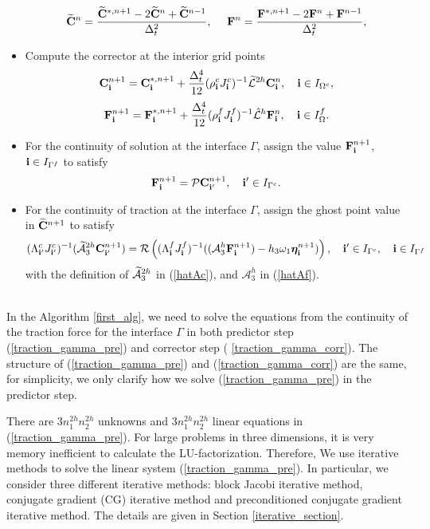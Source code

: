 \begin{breakablealgorithm}
\begin{itemize}
{			\begin{equation*}
			\widetilde{\bf C}^n= \frac{\widetilde{\bf C}^{*,n+1}-2\widetilde{\bf C}^{n}+\widetilde{\bf C}^{n-1}}{\Delta^2_t},\ \ \ \
			{\bf F}^{n} = \frac{{\bf F}^{*,n+1}-2{\bf F}^{n}+{\bf F}^{n-1}}{\Delta^2_t},
			\end{equation*}
		}
		\item{Compute the corrector at the interior grid points
			\[{\bf C}^{n+1}_{\bf i} = {\bf C}^{*,n+1}_{\bf i} + \frac{\Delta_t^4}{12}(\rho^{c}_{\bf i}J^c_{\bf i})^{-1}\widetilde{\mathcal{L}}^{2h}{\bf{C}}^{n}_{\bf i},\quad {\bf i}\in I_{\Omega^c},\]
			\[{\bf F}^{n+1}_{\bf i} = {\bf F}^{*,n+1}_{\bf i} + \frac{\Delta_t^4}{12}(\rho^{f}_{\bf i}J^f_{\bf i})^{-1}\hat{\mathcal{L}}^{h}{\bf{F}}^{n}_{\bf i},\quad {\bf i}\in I_\Omega^f.\]
		}
		\item{For the continuity of solution at the interface $\Gamma$, assign the value ${\bf F}^{n+1}_{\bf i}$, ${\bf i}\in I_{\Gamma^f}$ to satisfy
			\begin{equation*}
			{\bf F}^{n+1}_{\bf i} = {\mathcal{P}}{\bf C}^{n+1}_{{\bf i}'}, \quad {{\bf i}'}\in I_{\Gamma^c}.
			\end{equation*}
		}
		\item{For the continuity of traction at the interface $\Gamma$, assign the ghost point value in $\widetilde{\bf C}^{n+1}$ to satisfy
			\begin{equation}\label{traction_gamma_corr}
			({\Lambda}^{c}_{{\bf i}'}{J}_{{\bf i}'}^{c})^{-1}(\wt{\mathcal{A}}_3^{2h}{\bf C}^{n+1}_{{\bf i}'})
			= {\mathcal{R}}\left(({\Lambda}^{f}_{\bf i}{ J}^f_{\bf i})^{-1}((\mathcal{A}_3^h{\bf F}^{n+1}_{\bf i})-h_3\omega_1{\bm \eta}^{n+1}_{\bf i})\right), \quad {{\bf i}'}\in I_{\Gamma^c}, \quad {\bf i}\in I_{\Gamma^f}
			\end{equation}
			with the definition of $\widetilde{\mathcal{A}}_3^{2h}$ in (\ref{hatAc}), and $\mathcal{A}_3^h$ in (\ref{hatAf}).
		}
	\end{itemize}
\end{breakablealgorithm}
~\\

In the Algorithm \ref{first_alg}, we need to solve the equations from the continuity of the traction force for the interface $\Gamma$ in both predictor step (\ref{traction_gamma_pre}) and corrector step (
\ref{traction_gamma_corr}). The structure of (\ref{traction_gamma_pre}) and (\ref{traction_gamma_corr}) are the same, for simplicity, we only clarify how we solve (\ref{traction_gamma_pre}) in the predictor step.

There are $3n_1^{2h}n_2^{2h}$ unknowns and $3n_1^{2h}n_2^{2h}$ linear equations in (\ref{traction_gamma_pre}). For large problems in three dimensions, it is very memory inefficient to calculate the LU-factorization. Therefore, We use iterative methods to solve the linear system (\ref{traction_gamma_pre}). In particular, we consider three different iterative methods: block Jacobi iterative method, conjugate gradient (CG) iterative method and preconditioned conjugate gradient iterative method. The details are given in Section \ref{iterative_section}.